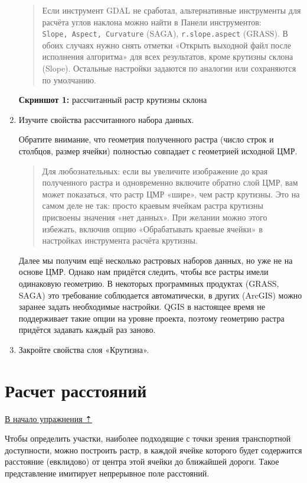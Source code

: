 \documentclass[
  12pt,
]{book}
\begin{document}
\begin{enumerate}
  \begin{quote}
  Если инструмент GDAL не сработал, альтернативные инструменты для расчёта углов наклона можно найти в Панели инструментов: \texttt{Slope,\ Aspect,\ Curvature} (SAGA), \texttt{r.slope.aspect} (GRASS). В обоих случаях нужно снять отметки «Открыть выходной файл после исполнения алгоритма» для всех результатов, кроме крутизны склона (Slope). Остальные настройки задаются по аналогии или сохраняются по умолчанию.
  \end{quote}

  \textbf{Скриншот 1:} рассчитанный растр крутизны склона
\item
  Изучите свойства рассчитанного набора данных.

  Обратите внимание, что геометрия полученного растра (число строк и столбцов, размер ячейки) полностью совпадает с геометрией исходной ЦМР.

  \begin{quote}
  Для любознательных: если вы увеличите изображение до края полученного растра и одновременно включите обратно слой ЦМР, вам может показаться, что растр ЦМР «шире», чем растр крутизны. Это на самом деле не так: просто краевым ячейкам растра крутизны присвоены значения «нет данных». При желании можно этого избежать, включив опцию «Обрабатывать краевые ячейки» в настройках инструмента расчёта крутизны.
  \end{quote}

  Далее мы получим ещё несколько растровых наборов данных, но уже не на основе ЦМР. Однако нам придётся следить, чтобы все растры имели одинаковую геометрию. В некоторых программных продуктах (GRASS, SAGA) это требование соблюдается автоматически, в других (ArcGIS) можно заранее задать необходимые настройки. QGIS в настоящее время не поддерживает такие опции на уровне проекта, поэтому геометрию растра придётся задавать каждый раз заново.
\item
  Закройте свойства слоя «Крутизна».
\end{enumerate}

\hypertarget{weighted-overlay-distances}{%
\section{Расчет расстояний}\label{weighted-overlay-distances}}

\protect\hyperlink{weighted-overlay}{В начало упражнения ⇡}

Чтобы определить участки, наиболее подходящие с точки зрения транспортной доступности, можно построить растр, в каждой ячейке которого будет содержится расстояние (евклидово) от центра этой ячейки до ближайшей дороги. Такое представление имитирует непрерывное поле расстояний.
\end{document}
